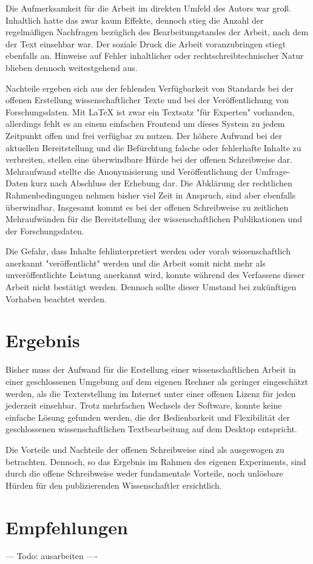 Die Aufmerksamkeit für die Arbeit im direkten Umfeld des Autors war groß. Inhaltlich hatte das zwar kaum Effekte, dennoch stieg die Anzahl der regelmäßigen Nachfragen bezüglich des Bearbeitungstandes der Arbeit, nach dem der Text einsehbar war. Der soziale Druck die Arbeit voranzubringen stiegt ebenfalls an. Hinweise auf Fehler inhaltlicher oder rechtschreibtechnischer Natur blieben dennoch weitestgehend aus.

Nachteile ergeben sich aus der fehlenden Verfügbarkeit von Standards bei der offenen Erstellung wissenschaftlicher Texte und bei der Veröffentlichung von Forschungsdaten. Mit LaTeX ist zwar ein Textsatz "für Experten"\cite{suchen} vorhanden, allerdings fehlt es an einem einfachen Frontend um dieses System zu jedem Zeitpunkt offen und frei verfügbar zu nutzen. Der höhere Aufwand bei der aktuellen Bereitstellung und die Befürchtung falsche oder fehlerhafte Inhalte zu verbreiten, stellen eine überwindbare Hürde bei der offenen Schreibweise dar. Mehraufwand stellte die Anonymisierung und Veröffentlichung der Umfrage-Daten kurz nach Abschluss der Erhebung dar. Die Abklärung der rechtlichen Rahmenbedingungen nehmen bisher viel Zeit in Anspruch, sind aber ebenfalls überwindbar. Insgesamt kommt es bei der offenen Schreibweise zu zeitlichen Mehraufwänden für die Bereitstellung der wissenschaftlichen Publikationen und der Forschungsdaten.

Die Gefahr, dass Inhalte fehlinterpretiert werden oder vorab wissenschaftlich anerkannt "veröffentlicht" werden und die Arbeit somit nicht mehr als unveröffentlichte Leistung anerkannt wird, konnte während des Verfassens dieser Arbeit nicht bestätigt werden. Dennoch sollte dieser Umstand bei zukünftigen Vorhaben beachtet werden.

\section{Ergebnis}

Bisher muss der Aufwand für die Erstellung einer wissenschaftlichen Arbeit in einer geschlossenen Umgebung auf dem eigenen Rechner als geringer eingeschätzt werden, als die Texterstellung im Internet unter einer offenen Lizenz für jeden jederzeit einsehbar. Trotz mehrfachen Wechsels der Software, konnte keine einfache Lösung gefunden werden, die der Bedienbarkeit und Flexibilität der geschlossenen wissenschaftlichen Textbearbeitung auf dem Desktop entspricht.

Die Vorteile und Nachteile der offenen Schreibweise sind als ausgewogen zu betrachten. Dennoch, so das Ergebnis im Rahmen des eigenen Experiments, sind durch die offene Schreibweise weder fundamentale Vorteile, noch unlösbare Hürden für den publizierenden Wissenschaftler ersichtlich.

\section{Empfehlungen}

--- Todo: ausarbeiten ----
